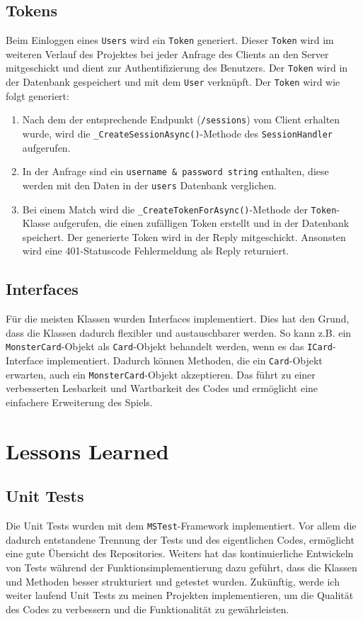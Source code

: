 \documentclass[a4paper, 12pt]{article}
\begin{document}
\subsection{Tokens}
Beim Einloggen eines \texttt{Users} wird ein \texttt{Token} generiert. Dieser \texttt{Token} wird im weiteren Verlauf des Projektes bei jeder Anfrage des Clients an den Server mitgeschickt und dient zur Authentifizierung des Benutzers. Der \texttt{Token} wird in der Datenbank gespeichert und mit dem \texttt{User} verknüpft. Der \texttt{Token} wird wie folgt generiert:
\begin{enumerate}
    \item Nach dem der entsprechende Endpunkt (\texttt{/sessions}) vom Client erhalten wurde, wird die \texttt{\_CreateSessionAsync()}-Methode des \texttt{SessionHandler} aufgerufen.
    \item In der Anfrage sind ein \texttt{username \& password string} enthalten, diese werden mit den Daten in der \texttt{users} Datenbank verglichen.
    \item Bei einem Match wird die \texttt{\_CreateTokenForAsync()}-Methode der \texttt{Token}-Klasse aufgerufen, die einen zufälligen Token erstellt und in der Datenbank speichert. Der generierte Token wird in der Reply mitgeschickt. Ansonsten wird eine 401-Statuscode Fehlermeldung als Reply returniert.
\end{enumerate}

\subsection{Interfaces}
Für die meisten Klassen wurden Interfaces implementiert. Dies hat den Grund, dass die Klassen dadurch flexibler und austauschbarer werden. 
So kann z.B. ein \texttt{MonsterCard}-Objekt als \texttt{Card}-Objekt behandelt werden, wenn es das \texttt{ICard}-Interface implementiert. 
Dadurch können Methoden, die ein \texttt{Card}-Objekt erwarten, auch ein \texttt{MonsterCard}-Objekt akzeptieren.
Das führt zu einer verbesserten Lesbarkeit und Wartbarkeit des Codes und ermöglicht eine einfachere Erweiterung des Spiels.

\section{Lessons Learned}
\subsection{Unit Tests}
Die Unit Tests wurden mit dem \texttt{MSTest}-Framework implementiert. Vor allem die dadurch entstandene Trennung der Tests und des eigentlichen Codes, ermöglicht eine gute Übersicht des Repositories.
Weiters hat das kontinuierliche Entwickeln von Tests während der Funktionsimplementierung dazu geführt, dass die Klassen und Methoden besser strukturiert und getestet wurden.
Zukünftig, werde ich weiter laufend Unit Tests zu meinen Projekten implementieren, um die Qualität des Codes zu verbessern und die Funktionalität zu gewährleisten.
\end{document}
